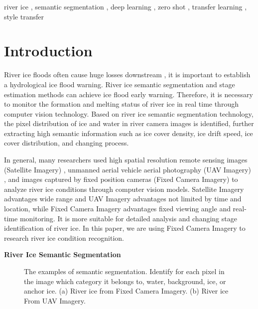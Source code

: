\documentclass[a4paper,fleqn]{cas-dc}
\begin{document}
\begin{keywords}
river ice \sep 
semantic segmentation \sep 
deep learning \sep
zero shot \sep
transfer learning \sep
style transfer

\end{keywords}

\maketitle



\section{Introduction}
River ice floods often cause huge losses downstream \cite{Yang_Pavelsky_Allen_2020}, it is important to establish a hydrological ice flood warning. River ice semantic segmentation and stage estimation methods can achieve ice flood early warning. Therefore, it is necessary to monitor the formation and melting status of river ice in real time through computer vision technology. Based on river ice semantic segmentation technology, the pixel distribution of ice and water in river camera images is identified, further extracting high semantic information such as ice cover density, ice drift speed, ice cover distribution, and changing process.

In general, many researchers used high spatial resolution remote sensing images (Satellite Imagery) \cite{Zhang_Yue_Han_Li_Yuan_Fan_Zhang_2021, Li_Li_Wang_Hao_2023}, unmanned aerial vehicle aerial photography (UAV Imagery) \cite{Singh_Kalke_Loewen_Ray_2020, Zhang_Zhao_Ran_Xing_Wang_Lan_Yin_He_Liu_Zhang_et_al_2023}, and images captured by fixed position cameras (Fixed Camera Imagery) \cite{Pei_She_Loewen_2022} to analyze river ice conditions through computer vision models. Satellite Imagery advantages wide range and UAV Imagery advantages not limited by time and location, while Fixed Camera Imagery advantages fixed viewing angle and real-time monitoring. It is more suitable for detailed analysis and changing stage identification of river ice. In this paper, we are using Fixed Camera Imagery to research river ice condition recognition.

\textbf{River Ice Semantic Segmentation}
\begin{figure}[h]
	\centering
	\caption{The examples of semantic segmentation. Identify for each pixel in the image which category it belongs to, water, background, ice, or anchor ice. (a) River ice from Fixed Camera Imagery. (b) River ice From UAV Imagery.}\label{Figure1}
\end{figure}
\end{document}
